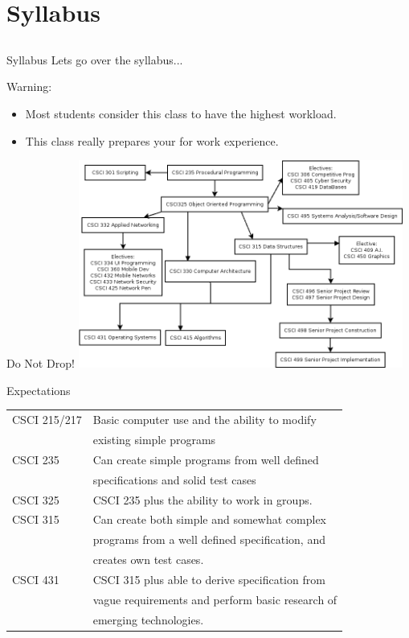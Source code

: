 \documentclass{beamer}
\begin{document}
\section{Syllabus}
\subsection{}

\begin{frame}{Syllabus}
Lets go over the syllabus...
\end{frame}

\begin{frame}{Warning:}
\begin{itemize}
\item Most students consider this class to have the highest workload.
\item This class really prepares your for work experience.
\end{itemize}
\end{frame}

\begin{frame}{Do Not Drop!}
\includegraphics[width=0.8\textwidth]{../imgs/cs-major.png}
\end{frame}

\begin{frame}{Expectations}
\begin{tabular}{l | l }
CSCI 215/217    & Basic computer use and the ability to modify \\ 
                & existing simple programs \\
CSCI 235        & Can create simple programs from well defined \\
                & specifications and solid test cases \\
CSCI 325        & CSCI 235 plus the ability to work in groups. \\
CSCI 315        & Can create both simple and somewhat complex  \\
                & programs from a well defined specification, and \\
                & creates own test cases. \\
CSCI 431        & CSCI 315 plus able to derive specification from \\
                & vague requirements and perform basic research of \\
                & emerging technologies. \\

\end{tabular}
\end{frame}
\end{document}
